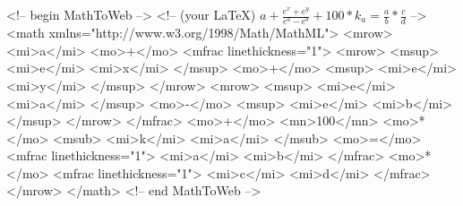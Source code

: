 <!-- begin MathToWeb -->
<!-- (your LaTeX) $a+\frac{e^x+e^y}{e^a-e^b}+100*k_a=\frac{a}{b}*\frac{c}{d}$ -->
<math xmlns="http://www.w3.org/1998/Math/MathML">
<mrow>
	<mi>a</mi>
	<mo>+</mo>
	<mfrac linethickness="1">
		<mrow>
			<msup>
				<mi>e</mi>
				<mi>x</mi>
			</msup>
			<mo>+</mo>
			<msup>
				<mi>e</mi>
				<mi>y</mi>
			</msup>
		</mrow>
		<mrow>
			<msup>
				<mi>e</mi>
				<mi>a</mi>
			</msup>
			<mo>-</mo>
			<msup>
				<mi>e</mi>
				<mi>b</mi>
			</msup>
		</mrow>
	</mfrac>
	<mo>+</mo>
	<mn>100</mn>
	<mo>*</mo>
	<msub>
		<mi>k</mi>
		<mi>a</mi>
	</msub>
	<mo>=</mo>
	<mfrac linethickness="1">
		<mi>a</mi>
		<mi>b</mi>
	</mfrac>
	<mo>*</mo>
	<mfrac linethickness="1">
		<mi>c</mi>
		<mi>d</mi>
	</mfrac>
</mrow>
</math>
<!-- end MathToWeb -->

